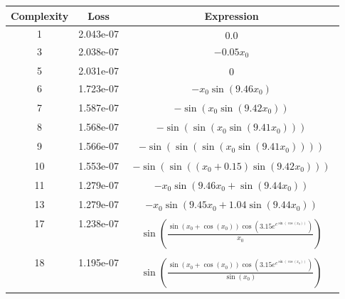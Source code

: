 \begin{center}
        \begin{tabular}{|c|c|c|}
        \hline
        Complexity & Loss & Expression \\
        \hline
        1 & 2.043e-07 & $\begin{aligned}0.0\end{aligned}$\\ \hline3 & 2.038e-07 & $\begin{aligned}- 0.05 x_{0}\end{aligned}$\\ \hline5 & 2.031e-07 & $\begin{aligned}0\end{aligned}$\\ \hline6 & 1.723e-07 & $\begin{aligned}- x_{0} \sin{\left(9.46 x_{0} \right)}\end{aligned}$\\ \hline7 & 1.587e-07 & $\begin{aligned}- \sin{\left(x_{0} \sin{\left(9.42 x_{0} \right)} \right)}\end{aligned}$\\ \hline8 & 1.568e-07 & $\begin{aligned}- \sin{\left(\sin{\left(x_{0} \sin{\left(9.41 x_{0} \right)} \right)} \right)}\end{aligned}$\\ \hline9 & 1.566e-07 & $\begin{aligned}- \sin{\left(\sin{\left(\sin{\left(x_{0} \sin{\left(9.41 x_{0} \right)} \right)} \right)} \right)}\end{aligned}$\\ \hline10 & 1.553e-07 & $\begin{aligned}- \sin{\left(\sin{\left(\left(x_{0} + 0.15\right) \sin{\left(9.42 x_{0} \right)} \right)} \right)}\end{aligned}$\\ \hline11 & 1.279e-07 & $\begin{aligned}- x_{0} \sin{\left(9.46 x_{0} + \sin{\left(9.44 x_{0} \right)} \right)}\end{aligned}$\\ \hline13 & 1.279e-07 & $\begin{aligned}- x_{0} \sin{\left(9.45 x_{0} + 1.04 \sin{\left(9.44 x_{0} \right)} \right)}\end{aligned}$\\ \hline17 & 1.238e-07 & $\begin{aligned}\sin{\left(\frac{\sin{\left(x_{0} + \cos{\left(x_{0} \right)} \right)} \cos{\left(3.15 e^{e^{\sin{\left(\cos{\left(x_{0} \right)} \right)}}} \right)}}{x_{0}} \right)}\end{aligned}$\\ \hline18 & 1.195e-07 & $\begin{aligned}\sin{\left(\frac{\sin{\left(x_{0} + \cos{\left(x_{0} \right)} \right)} \cos{\left(3.15 e^{e^{\sin{\left(\cos{\left(x_{0} \right)} \right)}}} \right)}}{\sin{\left(x_{0} \right)}} \right)}\end{aligned}$\\ 
\end{tabular}
\end{center}
